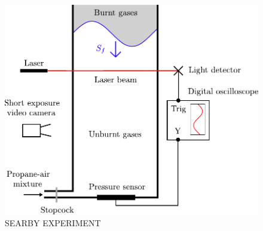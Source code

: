 \begin{figure}[t]
\centering
\includegraphics[scale=0.6]{assets/imgs/Searby-92.pdf}
\caption{SEARBY EXPERIMENT}
\label{fig:searby-experiment}
\end{figure}

